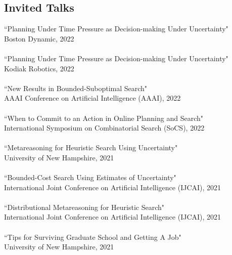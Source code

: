 \documentclass[margin, 10pt]{res} %
\begin{document}
\begin{resume}
\section{Invited Talks}
``Planning Under Time Pressure as Decision-making Under Uncertainty"\\
\-\hspace{0.5cm} Boston Dynamic, 2022\\~\\
``Planning Under Time Pressure as Decision-making Under Uncertainty"\\
\-\hspace{0.5cm} Kodiak Robotics, 2022\\~\\
``New Results in Bounded-Suboptimal Search"\\
\-\hspace{0.5cm} AAAI Conference on Artificial Intelligence (AAAI), 2022\\~\\
``When to Commit to an Action in Online Planning and Search"\\
\-\hspace{0.5cm} International Symposium on Combinatorial Search (SoCS), 2022\\~\\
``Metareasoning for Heuristic Search Using Uncertainty"\\
\-\hspace{0.5cm} University of New Hampshire, 2021\\~\\
``Bounded-Cost Search Using Estimates of Uncertainty"\\
\-\hspace{0.5cm}  International Joint Conference on Artificial Intelligence (IJCAI), 2021\\~\\
``Distributional Metareasoning for Heuristic Search"\\
\-\hspace{0.5cm}  International Joint Conference on Artificial Intelligence (IJCAI), 2021\\~\\
``Tips for Surviving Graduate School and Getting A Job"\\
\-\hspace{0.5cm} University of New Hampshire, 2021\\~\\

\end{resume}
\end{document}
